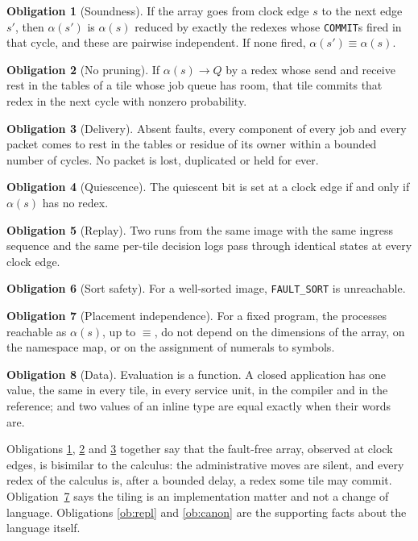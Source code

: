 \documentclass[10.5pt,a4paper]{extarticle}
\newcommand{\kw}[1]{\texttt{#1}}
\newcommand{\scong}{\equiv}
\newcommand{\red}{\rightarrow}
\theoremstyle{definition}
\newtheorem{obligation}{Obligation}
\theoremstyle{remark}
\begin{document}
\begin{obligation}[Soundness]\label{ob:sound}
If the array goes from clock edge $s$ to the next edge $s'$, then
$\alpha(s')$ is $\alpha(s)$ reduced by exactly the redexes whose \kw{COMMIT}s
fired in that cycle, and these are pairwise independent. If none fired,
$\alpha(s') \scong \alpha(s)$.
\end{obligation}
\begin{obligation}[No pruning]\label{ob:complete}
If $\alpha(s) \red Q$ by a redex whose send and receive rest in the tables of
a tile whose job queue has room, that tile commits that redex in the next
cycle with nonzero probability.
\end{obligation}
\begin{obligation}[Delivery]\label{ob:deliver}
Absent faults, every component of every job and every packet comes to rest in
the tables or residue of its owner within a bounded number of cycles. No
packet is lost, duplicated or held for ever.
\end{obligation}
\begin{obligation}[Quiescence]\label{ob:quiet}
The quiescent bit is set at a clock edge if and only if $\alpha(s)$ has no
redex.
\end{obligation}
\begin{obligation}[Replay]\label{ob:replay}
Two runs from the same image with the same ingress sequence and the same
per-tile decision logs pass through identical states at every clock edge.
\end{obligation}
\begin{obligation}[Sort safety]\label{ob:sort}
For a well-sorted image, \kw{FAULT\_SORT} is unreachable.
\end{obligation}
\begin{obligation}[Placement independence]\label{ob:place}
For a fixed program, the processes reachable as $\alpha(s)$, up to $\scong$,
do not depend on the dimensions of the array, on the namespace map, or on the
assignment of numerals to symbols.
\end{obligation}
\begin{obligation}[Data]\label{ob:data}
Evaluation is a function. A closed application has one value, the same in
every tile, in every service unit, in the compiler and in the reference; and
two values of an inline type are equal exactly when their words are.
\end{obligation}
Obligations \ref{ob:sound}, \ref{ob:complete} and \ref{ob:deliver} together
say that the fault-free array, observed at clock edges, is bisimilar to the
calculus: the administrative moves are silent, and every redex of the
calculus is, after a bounded delay, a redex some tile may commit.
Obligation~\ref{ob:place} says the tiling is an implementation matter and not
a change of language. Obligations \ref{ob:repl} and \ref{ob:canon} are the
supporting facts about the language itself.
\end{document}
